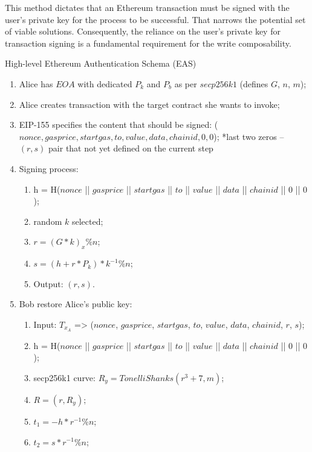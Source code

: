 This method dictates that an Ethereum transaction must be signed with the user's private key 
for the process to be successful. That narrows the potential set of viable solutions. 
Consequently, the reliance on the user's private key for transaction signing is a fundamental 
requirement for the write composability.

\begin{algorithm}[H]
    \caption{High-level Ethereum Authentication Schema (EAS)}
    \label{EAS}
    \begin{enumerate}
        \item Alice has ${EOA}$ with dedicated $P_k$ and $P_b$ as per ${secp256k1}$ (defines $G$, $n$, $m$); 
        \item Alice creates transaction with the target contract she wants to invoke;  
        \item EIP-155 specifies the content that should be signed:
        (\(nonce, gasprice, startgas, to, value, data, chainid, 0, 0\));
        *last two zeros -- $(r, s)$ pair that not yet defined on the current step
        \item Signing process:
        \begin{enumerate}
            \item h = H($nonce$ || $gasprice$ || $startgas$ || $to$ || $value$ || $data$ || $chainid$ || $0$ || $0$);
            \item random $k$ selected;
            \item $r = (G * k)_x \% n$;
            \item $s = (h + r * P_k)*k^{-1} \% n$;
            \item Output: $(r, s)$.
        \end{enumerate} 
        \item Bob restore Alice's public key: 
        \begin{enumerate}
            \item Input: $T_{x_A}$ => ($nonce$, $gasprice$, $startgas$, $to$, $value$, $data$, $chainid$, $r$, $s$); 
            \item h = H($nonce$ || $gasprice$ || $startgas$ || $to$ || $value$ || $data$ || $chainid$ || $0$ || $0$);
            \item secp256k1 curve: $R_y = TonelliShanks(r^3 + 7, m)$;
            \item $R = (r, R_y)$;
            \item $t_1 = -h * r^{-1} \% n$;
            \item $t_2 = s * r^{-1} \% n$;

\end{enumerate}
\end{enumerate}
\end{algorithm}
